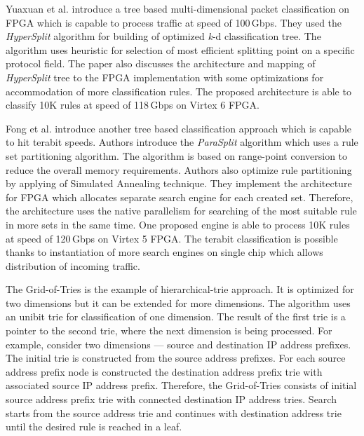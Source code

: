 Yuaxuan  et al. \cite{YaxuanFongClassification100andBeyond} introduce a tree based multi-dimensional packet classification on FPGA which is 
capable to process traffic at speed of 100\,Gbps. They used the \textit{HyperSplit} \cite{YaxuanHyperSplit} algorithm for building of optimized
\textit{k}-d classification tree. The algorithm uses heuristic for selection of most efficient splitting point on a specific protocol field. 
The paper also discusses the architecture and mapping of \textit{HyperSplit} tree to the FPGA implementation with some optimizations for 
accommodation of more classification rules. The proposed architecture is able to classify 10K rules at speed of 118\,Gbps on Virtex 6 FPGA.

Fong et al. \cite{FongWangParasplitTerabitClassification} introduce another tree based classification approach which is capable to 
hit terabit speeds. Authors introduce the \textit{ParaSplit} algorithm which uses a rule set partitioning algorithm.
The algorithm is based on range-point conversion to reduce the overall memory requirements. Authors also optimize rule partitioning 
by applying of Simulated Annealing technique. They implement the architecture for FPGA which allocates separate search engine
for each created set. Therefore, the architecture uses the native parallelism for searching of the most suitable rule in more sets in the same time.
One proposed engine is able to process 10K rules at speed of 120\,Gbps on Virtex 5 FPGA. The terabit classification is possible thanks to 
instantiation of more search engines on single chip which allows distribution of incoming traffic.

The Grid-of-Tries \cite{SrinivasanGridOfTries} is the example of hierarchical-trie approach. 
It is optimized for two dimensions but it can be extended for more dimensions. 
The algorithm uses an unibit trie \cite{EathertonUnibitTrie} for classification of one dimension. 
The result of the first trie is a pointer to the second trie, where the next dimension is being processed. 
For example, consider two dimensions ---  source and destination IP address prefixes. 
The initial trie is constructed from the source address prefixes. 
For each source address prefix node is constructed the destination address prefix trie with associated source IP address prefix. 
Therefore, the Grid-of-Tries consists of initial source address prefix trie with connected destination IP address tries. 
Search starts from the source address trie and continues with destination address trie until the desired rule is reached in a leaf. 

